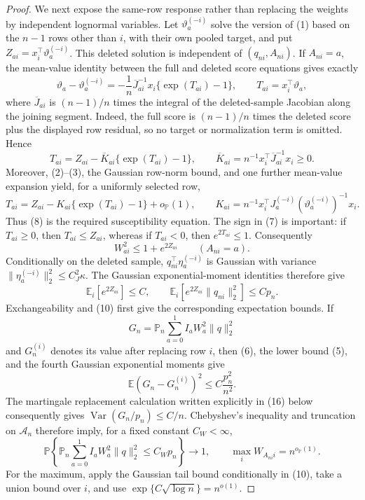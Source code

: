 \documentclass{article}
\begin{document}
\begin{proof}
We next expose the same-row response rather than replacing the weights by independent lognormal variables.  Let \(\vartheta_a^{(-i)}\) solve the version of (1) based on the \(n-1\) rows other than \(i\), with their own pooled target, and put \(Z_{ai}=x_i^{\top}\vartheta_a^{(-i)}\).  This deleted solution is independent of \((q_{ni},A_{ni})\).  If \(A_{ni}=a\), the mean-value identity between the full and deleted score equations gives exactly
\[
 \vartheta_a-\vartheta_a^{(-i)}
 =-\frac1n\overline J_{ai}^{-1}x_i\{\exp(T_{ai})-1\},
 \qquad T_{ai}=x_i^{\top}\vartheta_a,
 \tag{6}
\]
where \(\overline J_{ai}\) is \((n-1)/n\) times the integral of the deleted-sample Jacobian along the joining segment.  Indeed, the full score is \((n-1)/n\) times the deleted score plus the displayed row residual, so no target or normalization term is omitted.  Hence
\[
 T_{ai}=Z_{ai}-\overline K_{ai}\{\exp(T_{ai})-1\},
 \qquad
 \overline K_{ai}=n^{-1}x_i^{\top}\overline J_{ai}^{-1}x_i\ge0.
 \tag{7}
\]
Moreover, (2)--(3), the Gaussian row-norm bound, and one further mean-value expansion yield, for a uniformly selected row,
\[
 T_{ai}=Z_{ai}-K_{ai}\{\exp(T_{ai})-1\}+o_{\mathbb P}(1),
 \qquad
 K_{ai}=n^{-1}x_i^{\top}
 J_a^{(-i)}(\vartheta_a^{(-i)})^{-1}x_i.
 \tag{8}
\]
Thus (8) is the required susceptibility equation.  The sign in (7) is important: if \(T_{ai}\ge0\), then \(T_{ai}\le Z_{ai}\), whereas if \(T_{ai}<0\), then \(e^{2T_{ai}}\le1\).  Consequently
\[
 W_{ai}^2\le 1+e^{2Z_{ai}}
 \qquad(A_{ni}=a).
 \tag{9}
\]
Conditionally on the deleted sample, \(q_{ni}^{\top}\eta_a^{(-i)}\) is Gaussian with variance \(\|\eta_a^{(-i)}\|_2^2\le C_J^2\kappa\).  The Gaussian exponential-moment identities therefore give
\[
 \mathbb E_i[e^{2Z_{ai}}]\le C,
 \qquad
 \mathbb E_i[e^{2Z_{ai}}\|q_{ni}\|_2^2]\le Cp_n.
 \tag{10}
\]
Exchangeability and (10) first give the corresponding expectation bounds.  If
\[
 G_n=\mathbb P_n\sum_{a=0}^1 I_aW_a^2\|q\|_2^2
\]
and \(G_n^{(i)}\) denotes its value after replacing row \(i\), then (6), the lower bound (5), and the fourth Gaussian exponential moments give
\[
 \mathbb E(G_n-G_n^{(i)})^2\le C\frac{p_n^2}{n^2}.
\]
The martingale replacement calculation written explicitly in (16) below consequently gives \(\operatorname{Var}(G_n/p_n)\le C/n\).  Chebyshev's inequality and truncation on \(\mathcal A_n\) therefore imply, for a fixed constant \(C_W<\infty\),
\[
 \mathbb P\!\left\{
 \mathbb P_n\sum_{a=0}^1 I_aW_a^2\|q\|_2^2\le C_Wp_n
 \right\}\longrightarrow1,
 \qquad
 \max_{i}W_{A_{ni}i}=n^{o_{\mathbb P}(1)}.
 \tag{11}
\]
For the maximum, apply the Gaussian tail bound conditionally in (10), take a union bound over \(i\), and use \(\exp\{C\sqrt{\log n}\}=n^{o(1)}\).


\end{proof}
\end{document}
